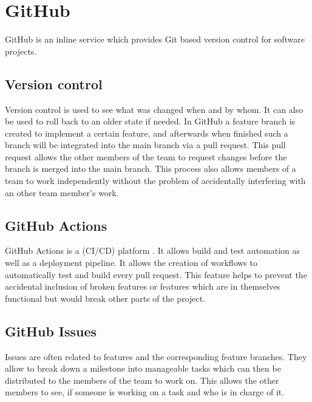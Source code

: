 \section{GitHub} \label{GitHub}
GitHub \cite{github_url} is an inline service which provides Git based version control for software projects.
\subsection{Version control}
Version control is used to see what was changed when and by whom. It can also be used to roll back to an older state if needed. In GitHub a feature branch is created to implement a certain feature, and afterwards when finished such a branch will be integrated into the main branch via a pull request. This pull request allows the other members of the team to request changes before the branch is merged into the main branch. This process also allows members of a team to work independently without the problem of accidentally interfering with an other team member's work.
\subsection{GitHub Actions}
GitHub Actions is a (CI/CD) platform \cite{github_actions_url}. It allows build and test automation as well as a deployment pipeline. It allows the creation of workflows to automatically test and build every pull request. This feature helps to prevent the accidental inclusion of broken features or features which are in themselves functional but would break other parts of the project.
\subsection{GitHub Issues}
Issues are often related to features and the corresponding feature branches. They allow to break down a milestone into manageable tasks which can then be distributed to the members of the team to work on. This allows the other members to see, if someone is working on a task and who is in charge of it. 